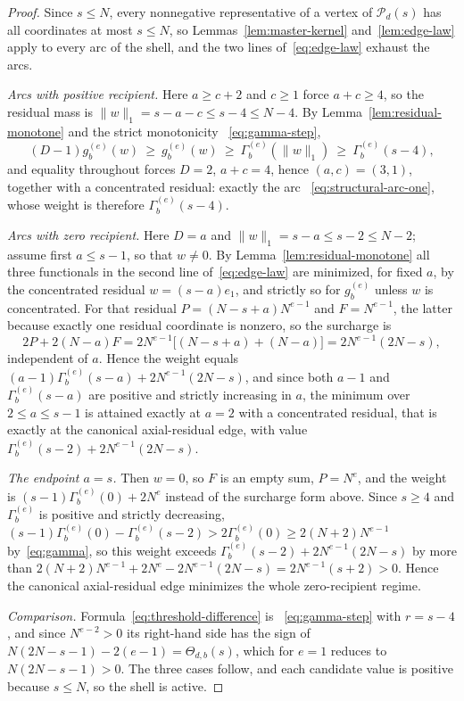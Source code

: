\documentclass[pdflatex,sn-mathphys-num]{sn-jnl}
\theoremstyle{thmstyleone}
\theoremstyle{thmstylethree}
\theoremstyle{thmstyletwo}
\begin{document}
\begin{proof}
Since $s\le N$, every nonnegative representative of a vertex of
$\mathcal P_d(s)$ has all coordinates at most $s\le N$, so
Lemmas~\ref{lem:master-kernel} and~\ref{lem:edge-law} apply to every arc of
the shell, and the two lines of~\eqref{eq:edge-law} exhaust the arcs.

\emph{Arcs with positive recipient.}  Here $a\ge c+2$ and $c\ge1$ force
$a+c\ge4$, so the residual mass is $\|w\|_1=s-a-c\le s-4\le N-4$.  By
Lemma~\ref{lem:residual-monotone} and the strict monotonicity
~\eqref{eq:gamma-step},
\[
 (D-1)g_b^{(e)}(w)\ \ge\ g_b^{(e)}(w)
 \ \ge\ \Gamma_b^{(e)}(\|w\|_1)
 \ \ge\ \Gamma_b^{(e)}(s-4),
\]
and equality throughout forces $D=2$, $a+c=4$, hence $(a,c)=(3,1)$, together
with a concentrated residual: exactly the arc
~\eqref{eq:structural-arc-one}, whose weight is therefore
$\Gamma_b^{(e)}(s-4)$.

\emph{Arcs with zero recipient.}  Here $D=a$ and
$\|w\|_1=s-a\le s-2\le N-2$; assume first $a\le s-1$, so that $w\ne0$.
By Lemma~\ref{lem:residual-monotone} all three functionals in the second line
of~\eqref{eq:edge-law} are minimized, for fixed $a$, by the concentrated
residual $w=(s-a)e_1$, and strictly so for $g_b^{(e)}$ unless $w$ is
concentrated.  For that residual $P=(N-s+a)N^{e-1}$ and $F=N^{e-1}$, the
latter because exactly one residual coordinate is nonzero, so the surcharge is
\[
 2P+2(N-a)F=2N^{e-1}\bigl[(N-s+a)+(N-a)\bigr]=2N^{e-1}(2N-s),
\]
independent of $a$.  Hence the weight equals
$(a-1)\Gamma_b^{(e)}(s-a)+2N^{e-1}(2N-s)$, and since both $a-1$ and
$\Gamma_b^{(e)}(s-a)$ are positive and strictly increasing in $a$, the
minimum over $2\le a\le s-1$ is attained exactly at $a=2$ with a concentrated
residual, that is exactly at the canonical axial-residual edge, with value
$\Gamma_b^{(e)}(s-2)+2N^{e-1}(2N-s)$.

\emph{The endpoint $a=s$.}  Then $w=0$, so $F$ is an empty sum, $P=N^e$, and
the weight is $(s-1)\Gamma_b^{(e)}(0)+2N^e$ instead of the surcharge form
above.  Since $s\ge4$ and $\Gamma_b^{(e)}$ is positive and strictly
decreasing,
$(s-1)\Gamma_b^{(e)}(0)-\Gamma_b^{(e)}(s-2)>2\Gamma_b^{(e)}(0)\ge2(N+2)N^{e-1}$
by~\eqref{eq:gamma}, so this weight exceeds
$\Gamma_b^{(e)}(s-2)+2N^{e-1}(2N-s)$ by more than
$2(N+2)N^{e-1}+2N^e-2N^{e-1}(2N-s)=2N^{e-1}(s+2)>0$.  Hence the canonical
axial-residual edge minimizes the whole zero-recipient regime.

\emph{Comparison.}  Formula~\eqref{eq:threshold-difference} is
~\eqref{eq:gamma-step} with $r=s-4$, and since $N^{e-2}>0$ its right-hand
side has the sign of $N(2N-s-1)-2(e-1)=\Theta_{d,b}(s)$, which for $e=1$
reduces to $N(2N-s-1)>0$.  The three cases follow, and each candidate value
is positive because $s\le N$, so the shell is active.


\end{proof}
\end{document}
